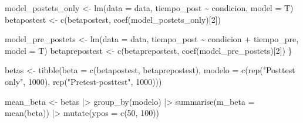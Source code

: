 \documentclass[
  letterpaper,
  DIV=11,
  numbers=noendperiod,
  oneside]{scrreprt}
\newenvironment{Shaded}{\begin{snugshade}}{\end{snugshade}}
\newcommand{\AttributeTok}[1]{\textcolor[rgb]{0.40,0.45,0.13}{#1}}
\newcommand{\DecValTok}[1]{\textcolor[rgb]{0.68,0.00,0.00}{#1}}
\newcommand{\FunctionTok}[1]{\textcolor[rgb]{0.28,0.35,0.67}{#1}}
\newcommand{\NormalTok}[1]{\textcolor[rgb]{0.00,0.23,0.31}{#1}}
\newcommand{\OtherTok}[1]{\textcolor[rgb]{0.00,0.23,0.31}{#1}}
\newcommand{\SpecialCharTok}[1]{\textcolor[rgb]{0.37,0.37,0.37}{#1}}
\newcommand{\StringTok}[1]{\textcolor[rgb]{0.13,0.47,0.30}{#1}}
\begin{document}
\begin{Shaded}
\begin{Highlighting}[]
\NormalTok{  model\_postets\_only }\OtherTok{\textless{}{-}} \FunctionTok{lm}\NormalTok{(}\AttributeTok{data =}\NormalTok{ data, tiempo\_post }\SpecialCharTok{\textasciitilde{}}\NormalTok{ condicion, }\AttributeTok{model =}\NormalTok{ T)}
\NormalTok{  betapostest }\OtherTok{\textless{}{-}} \FunctionTok{c}\NormalTok{(betapostest, }\FunctionTok{coef}\NormalTok{(model\_postets\_only)[}\DecValTok{2}\NormalTok{])}
  
\NormalTok{  model\_pre\_postets }\OtherTok{\textless{}{-}} \FunctionTok{lm}\NormalTok{(}\AttributeTok{data =}\NormalTok{ data, tiempo\_post }\SpecialCharTok{\textasciitilde{}}\NormalTok{ condicion }\SpecialCharTok{+}\NormalTok{ tiempo\_pre, }\AttributeTok{model =}\NormalTok{ T)}
\NormalTok{  betaprepostest }\OtherTok{\textless{}{-}} \FunctionTok{c}\NormalTok{(betaprepostest, }\FunctionTok{coef}\NormalTok{(model\_pre\_postets)[}\DecValTok{2}\NormalTok{])}
\NormalTok{\}}

\NormalTok{betas }\OtherTok{\textless{}{-}} \FunctionTok{tibble}\NormalTok{(}\AttributeTok{beta =} \FunctionTok{c}\NormalTok{(betapostest, betaprepostest),}
                \AttributeTok{modelo =} \FunctionTok{c}\NormalTok{(}\FunctionTok{rep}\NormalTok{(}\StringTok{"Posttest only"}\NormalTok{, }\DecValTok{1000}\NormalTok{), }\FunctionTok{rep}\NormalTok{(}\StringTok{"Pretest{-}posttest"}\NormalTok{, }\DecValTok{1000}\NormalTok{)))}

\NormalTok{mean\_beta }\OtherTok{\textless{}{-}}\NormalTok{ betas }\SpecialCharTok{|\textgreater{}}
  \FunctionTok{group\_by}\NormalTok{(modelo) }\SpecialCharTok{|\textgreater{}}
  \FunctionTok{summarise}\NormalTok{(}\AttributeTok{m\_beta =} \FunctionTok{mean}\NormalTok{(beta)) }\SpecialCharTok{|\textgreater{}}
  \FunctionTok{mutate}\NormalTok{(}\AttributeTok{ypos =} \FunctionTok{c}\NormalTok{(}\DecValTok{50}\NormalTok{, }\DecValTok{100}\NormalTok{))}


\end{Highlighting}
\end{Shaded}
\end{document}
